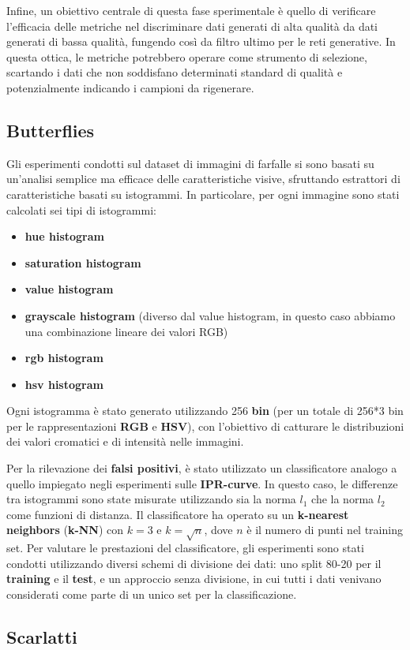 Infine, un obiettivo centrale di questa fase sperimentale è quello di verificare l'efficacia delle metriche nel discriminare dati generati di alta qualità da dati generati di bassa qualità, 
fungendo così da filtro ultimo per le reti generative. In questa ottica, le metriche potrebbero operare come strumento di selezione, scartando i dati che non soddisfano determinati standard di qualità e potenzialmente indicando i campioni da rigenerare.

\subsection{Butterflies}

Gli esperimenti condotti sul dataset di immagini di farfalle si sono basati su un'analisi semplice ma efficace delle caratteristiche visive, sfruttando estrattori di caratteristiche basati su istogrammi. In particolare, per ogni immagine sono stati calcolati sei tipi di istogrammi: 
\begin{itemize}
    \item \textbf{hue histogram}
    \item \textbf{saturation histogram}
    \item \textbf{value histogram}
    \item \textbf{grayscale histogram} (diverso dal value histogram, in questo caso abbiamo una combinazione lineare dei valori RGB)
    \item \textbf{rgb histogram}
    \item \textbf{hsv histogram}
\end{itemize}
Ogni istogramma è stato generato utilizzando 256 \textbf{bin} (per un totale di 256*3 bin per le rappresentazioni \textbf{RGB} e \textbf{HSV}), con l’obiettivo di catturare le distribuzioni dei valori cromatici e di intensità nelle immagini.

Per la rilevazione dei \textbf{falsi positivi}, è stato utilizzato un classificatore analogo a quello impiegato negli esperimenti sulle \textbf{IPR-curve}. In questo caso, le differenze tra istogrammi sono state misurate utilizzando sia la norma \(l_1\) che la norma \(l_2\)​ come funzioni di distanza. Il classificatore ha operato su un \textbf{k-nearest neighbors} (\textbf{k-NN}) con \(k=3\) e \(k=\sqrt{n}\), dove \(n\) è il numero di punti nel training set.
​Per valutare le prestazioni del classificatore, gli esperimenti sono stati condotti utilizzando diversi schemi di divisione dei dati: uno split 80-20 per il \textbf{training} e il \textbf{test}, e un approccio senza divisione, in cui tutti i dati venivano considerati come parte di un unico set per la classificazione.

\subsection{Scarlatti}





